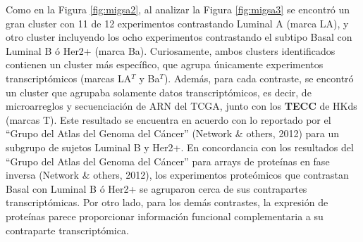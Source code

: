 \documentclass[12pt,twoside]{reedthesis}
\begin{document}
Como en la Figura \ref{fig:migsa2}, al analizar la Figura \ref{fig:migsa3} se encontró un gran cluster con 11 de 12 experimentos contrastando Luminal A (marca LA), y otro cluster incluyendo los ocho experimentos contrastando el subtipo Basal con Luminal B ó Her2+ (marca Ba). Curiosamente, ambos clusters identificados contienen un cluster más específico, que agrupa únicamente experimentos transcriptómicos (marcas LA\(^T\) y Ba\(^T\)). Además, para cada contraste, se encontró un cluster que agrupaba solamente datos transcriptómicos, es decir, de microarreglos y secuenciación de ARN del TCGA, junto con los \textbf{TECC} de HKds (marcas T). Este resultado se encuentra en acuerdo con lo reportado por el ``Grupo del Atlas del Genoma del Cáncer'' (Network \& others, 2012) para un subgrupo de sujetos Luminal B y Her2+. En concordancia con los resultados del ``Grupo del Atlas del Genoma del Cáncer'' para arrays de proteínas en fase inversa (Network \& others, 2012), los experimentos proteómicos que contrastan Basal con Luminal B ó Her2+ se agruparon cerca de sus contrapartes transcriptómicas. Por otro lado, para los demás contrastes, la expresión de proteínas parece proporcionar información funcional complementaria a su contraparte transcriptómica.

\par
\end{document}
